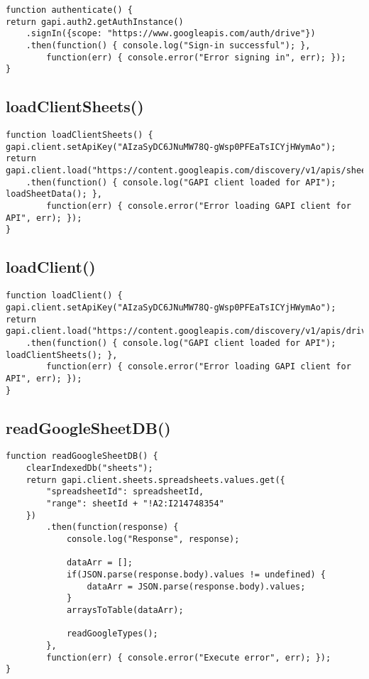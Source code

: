 \documentclass[letterpaper]{article}
\begin{document}
\begin{lstlisting}[firstnumber=83]
function authenticate() {
return gapi.auth2.getAuthInstance()
    .signIn({scope: "https://www.googleapis.com/auth/drive"})
    .then(function() { console.log("Sign-in successful"); },
        function(err) { console.error("Error signing in", err); });
}
\end{lstlisting}

\subsection{loadClientSheets()}

\begin{lstlisting}[firstnumber=90]
function loadClientSheets() {
gapi.client.setApiKey("AIzaSyDC6JNuMW78Q-gWsp0PFEaTsICYjHWymAo");
return gapi.client.load("https://content.googleapis.com/discovery/v1/apis/sheets/v4/rest")
    .then(function() { console.log("GAPI client loaded for API"); loadSheetData(); },
        function(err) { console.error("Error loading GAPI client for API", err); });
}
\end{lstlisting}

\subsection{loadClient()}

\begin{lstlisting}[firstnumber=97]
function loadClient() {
gapi.client.setApiKey("AIzaSyDC6JNuMW78Q-gWsp0PFEaTsICYjHWymAo");
return gapi.client.load("https://content.googleapis.com/discovery/v1/apis/drive/v3/rest")
    .then(function() { console.log("GAPI client loaded for API"); loadClientSheets(); },
        function(err) { console.error("Error loading GAPI client for API", err); });
}
\end{lstlisting}

\subsection{readGoogleSheetDB()}

\begin{lstlisting}[firstnumber=104]
function readGoogleSheetDB() {
    clearIndexedDb("sheets");
    return gapi.client.sheets.spreadsheets.values.get({
        "spreadsheetId": spreadsheetId,
        "range": sheetId + "!A2:I214748354"
    })
        .then(function(response) {
            console.log("Response", response);

            dataArr = [];
            if(JSON.parse(response.body).values != undefined) {
                dataArr = JSON.parse(response.body).values;
            }
            arraysToTable(dataArr);

            readGoogleTypes();
        },
        function(err) { console.error("Execute error", err); });
}
\end{lstlisting}
\end{document}
